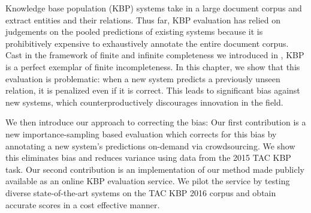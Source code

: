 Knowledge base population (KBP) systems take in a large document corpus and extract entities and their relations.
Thus far, KBP evaluation has relied on judgements on the pooled predictions of existing systems because it is prohibitively expensive to exhaustively annotate the entire document corpus.
Cast in the framework of finite and infinite completeness we introduced in , KBP is a perfect exemplar of finite incompleteness.
In this chapter, we show that this evaluation is problematic:
  when a new system predicts a previously unseen relation, it is penalized even if it is correct.
This leads to significant bias against new systems, which counterproductively discourages innovation in the field.

We then introduce our approach to correcting the bias:
Our first contribution is a new importance-sampling based evaluation which corrects for this bias by annotating a new system's predictions on-demand via crowdsourcing.
We show this eliminates bias and reduces variance using data from the 2015 TAC KBP task. %
Our second contribution is an implementation of our method made publicly available as an online KBP evaluation service.
We pilot the service by testing diverse state-of-the-art systems on the TAC KBP 2016 corpus and obtain accurate scores in a cost effective manner. 
